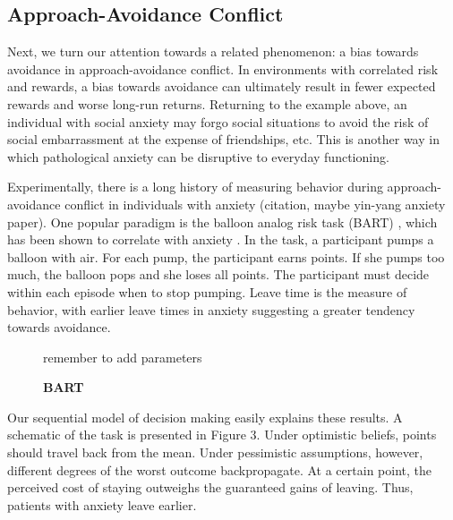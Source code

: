 \documentclass[11pt]{article} %
\begin{document}
\subsection{Approach-Avoidance Conflict}

Next, we turn our attention towards a related phenomenon: a bias towards avoidance
in approach-avoidance conflict. In environments with correlated risk and rewards,
a bias towards avoidance can ultimately result in fewer expected rewards and worse
long-run returns. Returning to the example above, an individual with social anxiety
may forgo social situations to avoid the risk of social embarrassment at the expense
of friendships, etc. This is another way in which pathological anxiety can be
disruptive to everyday functioning.

Experimentally, there is a long history of measuring behavior during
approach-avoidance conflict in individuals with anxiety (citation, maybe yin-yang anxiety paper).
One popular paradigm is the balloon analog risk task (BART) \citep{Lejuez2002},
which has been shown to correlate with anxiety \cite{Maner2007, Giorgetta2012}.
In the task, a participant pumps a balloon with air. For each pump, the participant
earns points. If she pumps too much, the balloon pops and she loses all points.
The participant must decide within each episode when to stop pumping. Leave time
is the measure of behavior, with earlier leave times in anxiety suggesting a
greater tendency towards avoidance.

\begin{figure}
  \centerline{%
  }
  \caption{\textbf{BART}}
  \par remember to add parameters
\end{figure}

Our sequential model of decision making easily explains these results. A schematic
of the task is presented in Figure 3. Under optimistic beliefs, points should
travel back from the mean. Under pessimistic assumptions, however, different
degrees of the worst outcome backpropagate. At a certain point, the perceived cost
of staying outweighs the guaranteed gains of leaving. Thus, patients with anxiety
leave earlier.
\end{document}
